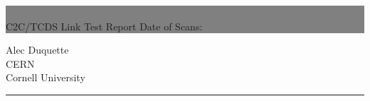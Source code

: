 \documentclass{report}
\begin{document}

\begin{titlepage} %
  
  
  \colorbox{grey}{
    \parbox[t]{0.93\textwidth}{ %
      \parbox[t]{0.91\textwidth}{ %
        \raggedleft %
        \fontsize{80pt}{40pt}\selectfont %
        \vspace{0.7cm} %

        \CM\\
        C2C/TCDS Link Test Report
        Date of Scans: \dateofscans\\
        
        \vspace{0.7cm} %
        }
      }
    }

  \vfill %
  
  
  \parbox[t]{0.93\textwidth}{ %
    \raggedleft %
    \large %
    {\Large Alec Duquette}\\[4pt] %
    CERN\\
    Cornell University\\[4pt] %
    
    \hfill\rule{0.2\linewidth}{1pt}%
    }
  
\end{titlepage}

\hypertarget{MyToc}{}  %
\tableofcontents
\newpage
\end{document}
